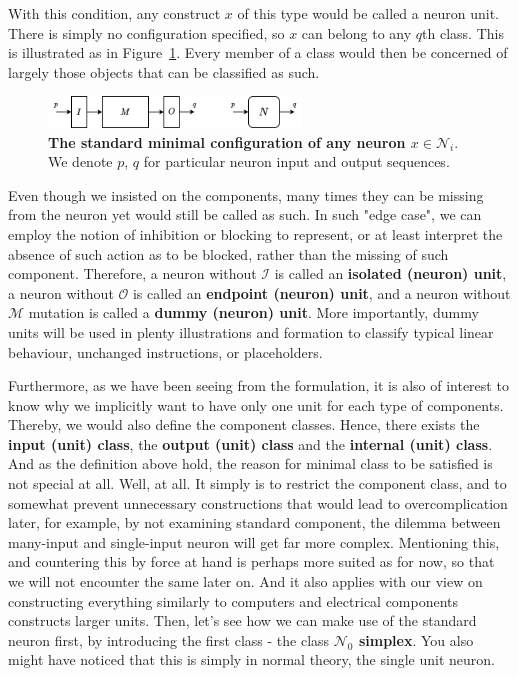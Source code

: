 With this condition, any construct $x$ of this type would be called a neuron unit. There is simply no configuration specified, so $x$ can belong to any $q$th class. This is illustrated as in Figure~\ref{fig:nn1}. Every member of a class would then be concerned of largely those objects that can be classified as such. 
\begin{figure}[htb]
    \centering
    \includegraphics[width=0.6\textwidth]{img/nn1.png}
    \caption{\textbf{The standard minimal configuration of any neuron $x\in \mathcal{N}_{i}$}. We denote $p$, $q$ for particular neuron input and output sequences.}
    \label{fig:nn1}
\end{figure}

Even though we insisted on the components, many times they can be missing from the neuron yet would still be called as such. In such "edge case", we can employ the notion of inhibition or blocking to represent, or at least interpret the absence of such action as to be blocked, rather than the missing of such component. Therefore, a neuron without $\mathcal{I}$ is called an \textbf{isolated (neuron) unit}, a neuron without $\mathcal{O}$ is called an \textbf{endpoint (neuron) unit}, and a neuron without $\mathcal{M}$ mutation is called a \textbf{dummy (neuron) unit}. More importantly, dummy units will be used in plenty illustrations and formation to classify typical linear behaviour, unchanged instructions, or placeholders. 

Furthermore, as we have been seeing from the formulation, it is also of interest to know why we implicitly want to have only one unit for each type of components. Thereby, we would also define the component classes. Hence, there exists the \textbf{input (unit) class}, the \textbf{output (unit) class} and the \textbf{internal (unit) class}. And as the definition above hold, the reason for minimal class to be satisfied is not special at all. Well, at all. It simply is to restrict the component class, and to somewhat prevent unnecessary constructions that would lead to overcomplication later, for example, by not examining standard component, the dilemma between many-input and single-input neuron will get far more complex. Mentioning this, and countering this by force at hand is perhaps more suited as for now, so that we will not encounter the same later on. And it also applies with our view on constructing everything similarly to computers and electrical components constructs larger units. Then, let's see how we can make use of the standard neuron first, by introducing the first class - the class \textbf{$\mathcal{N}_{0}$ simplex}. You also might have noticed that this is simply in normal theory, the single unit neuron. 

